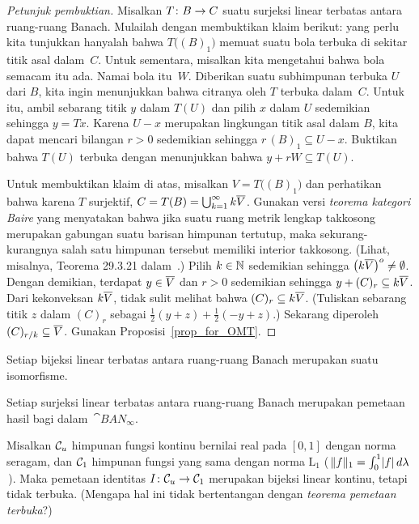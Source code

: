 \begin{proof}[\emph{Petunjuk pembuktian}] Misalkan $T\colon B \rightarrow C$ suatu surjeksi linear terbatas antara ruang-ruang Banach.
Mulailah dengan membuktikan klaim berikut: yang perlu kita tunjukkan hanyalah bahwa $T\bigl((B)_1\bigr)$ memuat suatu bola terbuka di sekitar
titik asal dalam~$C$.  Untuk sementara, misalkan kita mengetahui bahwa bola semacam itu ada.  Namai bola itu~$W$.  Diberikan suatu subhimpunan terbuka $U$ dari $B$, kita
ingin menunjukkan bahwa citranya oleh $T$ terbuka dalam~$C$.  Untuk itu, ambil sebarang titik $y$ dalam $T(U)$ dan pilih $x$
dalam $U$ sedemikian sehingga $y = Tx$.  Karena $U - x$ merupakan lingkungan titik asal dalam $B$, kita dapat mencari bilangan $r > 0$ sedemikian sehingga
$r\,(B)_1 \subseteq U - x$.  Buktikan bahwa $T(U)$ terbuka dengan menunjukkan bahwa $y + rW \subseteq T(U)$.

Untuk membuktikan klaim di atas, misalkan $V = T\bigl((B)_1\bigr)$ dan perhatikan bahwa karena $T$ surjektif, $C = T(B) =
\bigcup_{k=1}^\infty k\overline{V}$.  Gunakan versi \emph{teorema kategori Baire} yang menyatakan bahwa jika suatu ruang metrik lengkap takkosong
merupakan gabungan suatu barisan himpunan tertutup, maka sekurang-kurangnya salah satu himpunan tersebut memiliki interior takkosong.
(Lihat, misalnya, Teorema 29.3.21 dalam~\cite{Erdman:2007}.)  Pilih $k \in \mathbb{N}$ sedemikian sehingga $\bigl(k\overline{V}\bigr)^o \neq \emptyset$.
Dengan demikian, terdapat $y \in \overline{V}$ dan $r > 0$ sedemikian sehingga $y + (C)_r \subseteq k\overline{V}$.  Dari kekonveksan
$k\overline{V}$, tidak sulit melihat bahwa $(C)_r \subseteq k\overline{V}$.  (Tuliskan sebarang titik $z$ dalam $(C)_r$ sebagai
$\frac12(y + z) + \frac12(-y + z)$.) Sekarang diperoleh $(C)_{r/k} \subseteq \overline{V}$.  Gunakan Proposisi~\ref{prop_for_OMT}.
\ns \end{proof}

\begin{cor}\label{C069417} Setiap bijeksi linear terbatas antara ruang-ruang Banach merupakan suatu
isomorfisme.
\end{cor}

\begin{cor} Setiap surjeksi linear terbatas antara ruang-ruang Banach
merupakan pemetaan hasil bagi dalam~$\cat{BAN_\infty}$.
\end{cor}

\begin{exam} Misalkan $\mathcal{C}_u$ himpunan fungsi kontinu bernilai real pada $[0,1]$ dengan
norma seragam, dan $\mathcal{C}_1$ himpunan fungsi yang sama dengan norma $\mathrm{L_1}$
(\,$\lVert f\rVert_1 = \int_0^1\lvert f\rvert\,d\lambda$\,). Maka pemetaan identitas $I\colon \mathcal{C}_u
\rightarrow \mathcal{C}_1$ merupakan bijeksi linear kontinu, tetapi tidak terbuka. (Mengapa hal ini tidak
bertentangan dengan \emph{teorema pemetaan terbuka}?)
\end{exam}

